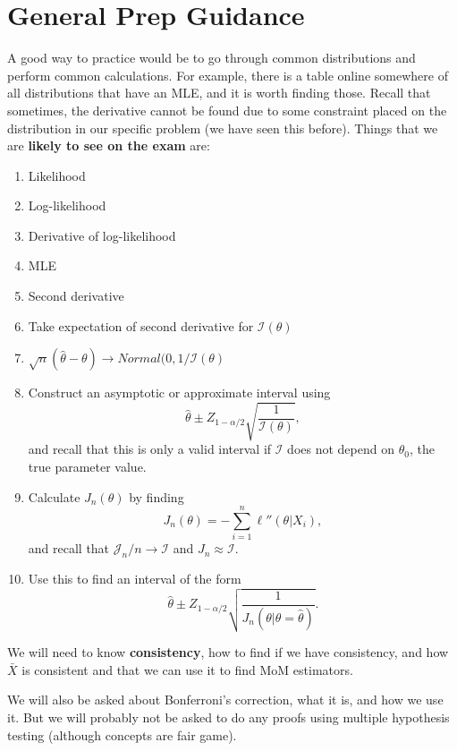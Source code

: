 \documentclass[titlepage, 12pt, leqno]{article}
\begin{document}
\pagebreak
\section{General Prep Guidance}
A good way to practice would be to go through common distributions and
perform common calculations. For example, there is a table online somewhere
of all distributions that have an MLE, and it is worth finding those. Recall
that sometimes, the derivative cannot be found due to some constraint placed
on the distribution in our specific problem (we have seen this before).
Things that we are \textbf{likely to see on the exam} are:
\begin{enumerate}
    \item Likelihood
    \item Log-likelihood
    \item Derivative of log-likelihood
    \item MLE
    \item Second derivative
    \item Take expectation of second derivative for $\mathcal{I}(\theta)$
    \item $\sqrt{n}(\hat \theta - \theta) \rightarrow Normal(0, 1/\mathcal{I}
        (\theta)$
    \item Construct an asymptotic or approximate interval using
        \[
        \hat \theta \pm Z_{1-\alpha/2} \sqrt{\frac{1}{\mathcal{I}(\theta)}},
        \]
        and recall that this is only a valid interval if $\mathcal{I}$ does
        not depend on $\theta_{0}$, the true parameter value.
    \item Calculate $J_{n}(\theta)$ by finding
        \[
        J_{n}(\theta) = -\sum_{i=1}^{n}\ell''(\theta|X_{i}),
        \]
        and recall that $\mathcal{J}_{n}/n \rightarrow \mathcal{I}$ and 
        $J_{n}\approx \mathcal{I}$. 
    \item Use this to find an interval of the form
        \[
            \hat \theta \pm Z_{1-\alpha/2}\sqrt{\frac{1}{J_{n}(\theta|\theta=
            \hat \theta)}}.
        \]
\end{enumerate}

We will need to know \textbf{consistency}, how to find if we have consistency,
and how $\bar X$ is consistent and that we can use it to find MoM estimators.

We will also be asked about Bonferroni's correction, what it is, and how we use
it. But we will probably not be asked to do any proofs using multiple hypothesis
testing (although concepts are fair game).
\end{document}
